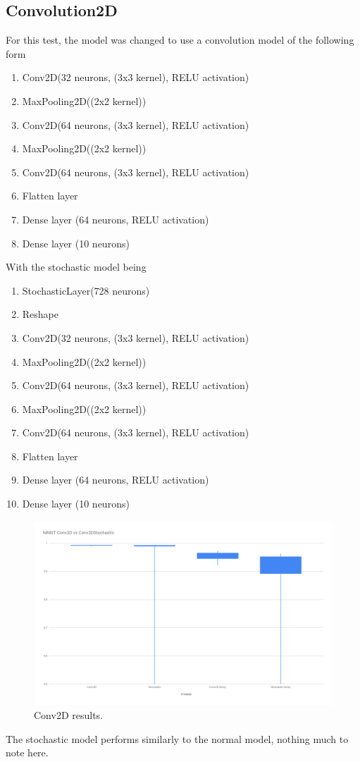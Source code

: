 \documentclass[a4paper,oneside,phd,etd]{BYUPhys}
\begin{document}
\subsection{Convolution2D}
For this test, the model was changed to use a convolution model of the following form
\begin{enumerate}
    \item Conv2D(32 neurons, (3x3 kernel), RELU activation)
    \item MaxPooling2D((2x2 kernel))
    \item Conv2D(64 neurons, (3x3 kernel), RELU activation)
    \item MaxPooling2D((2x2 kernel))
    \item Conv2D(64 neurons, (3x3 kernel), RELU activation)
    \item Flatten layer
    \item Dense layer (64 neurons, RELU activation)
    \item Dense layer (10 neurons)
\end{enumerate}
With the stochastic model being
\begin{enumerate}
    \item StochasticLayer(728 neurons)
    \item Reshape
    \item Conv2D(32 neurons, (3x3 kernel), RELU activation)
    \item MaxPooling2D((2x2 kernel))
    \item Conv2D(64 neurons, (3x3 kernel), RELU activation)
    \item MaxPooling2D((2x2 kernel))
    \item Conv2D(64 neurons, (3x3 kernel), RELU activation)
    \item Flatten layer
    \item Dense layer (64 neurons, RELU activation)
    \item Dense layer (10 neurons)
\end{enumerate}

\begin{figure}[H]
\centering
\includegraphics[width=16cm]{results/conv2d.png}
\caption{Conv2D results.}
\label{fig:conv2d}
\end{figure}
The stochastic model performs similarly to the normal model, nothing much to note here.
\end{document}
